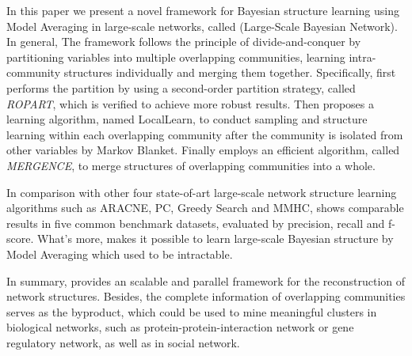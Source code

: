 In this paper we present a novel framework for Bayesian structure learning using Model Averaging in large-scale networks, called \lama{}(Large-Scale Bayesian Network). In general, The framework follows the principle of divide-and-conquer by partitioning variables into multiple overlapping communities, learning intra-community structures individually and merging them together. Specifically, \lama{} first performs the partition by using a second-order partition strategy, called \emph{ROPART}, which is verified to achieve more robust results. Then \lama{} proposes a learning algorithm, named LocalLearn, to conduct sampling and structure learning within each overlapping community after the community is isolated from other variables by Markov Blanket. Finally \lama{} employs an efficient algorithm, called \emph{MERGENCE}, to merge structures of overlapping communities into a whole.

In comparison with other four state-of-art large-scale network structure learning algorithms such as ARACNE, PC, Greedy Search and MMHC, \lama{} shows comparable results in five common benchmark datasets, evaluated by precision, recall and f-score. What's more, \lama{} makes it possible to learn large-scale Bayesian structure by Model Averaging which used to be intractable.

In summary, \lama{} provides an scalable and parallel framework for the reconstruction of network structures. Besides, the complete information of overlapping communities serves as the byproduct, which could be used to mine meaningful clusters in biological networks, such as protein-protein-interaction network or gene regulatory network, as well as in social network.








